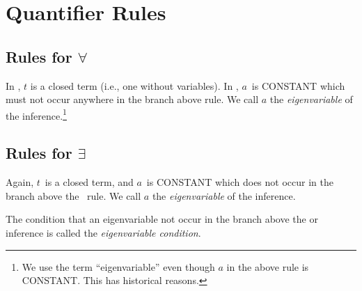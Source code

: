 \documentclass[10pt,a4paper]{article}
\newcommand*{\olup}[1]{\MakeUppercase{#1}}
\theoremstyle{plain}
\theoremstyle{definition}
\theoremstyle{remark}
\newcommand*{\olfileid}[3]{}
\newcommand*{\olsection}[1]{\section*{#1}}
\providecommand{\AxiomC}[1]{}
\providecommand{\UnaryInfC}[1]{}
\providecommand{\RightLabel}[1]{}
\providecommand{\DisplayProof}{}
\providecommand{\lforall}{\mathord{\forall}}
\providecommand{\lexists}{\mathord{\exists}}
\providecommand{\sFmla}[2]{#1(#2)}
\providecommand{\True}{\top}
\providecommand{\False}{\bot}
\providecommand{\TRule}[1]{}
\begin{document}



\olfileid{fol}{tab}{qrl}

\olsection{Quantifier Rules}

\subsection{Rules for $\lforall$}

\begin{defish}
\AxiomC{\sFmla{\True}{\lforall[x][A(x)]}}
\RightLabel{\TRule{\True}{\forall}}
\UnaryInfC{\sFmla{\True}{A(t)}}
\DisplayProof
\hfill
\AxiomC{\sFmla{\False}{\lforall[x][A(x)]}}
\RightLabel{\TRule{\False}{\lforall}}
\UnaryInfC{\sFmla{\False}{A(a)}}
\DisplayProof
\end{defish}

In \TRule{\True}{\lforall}, $t$ is a closed term (i.e., one without
variables). In \TRule{\False}{\lforall}, $a$~is \olup{constant} which
must not occur anywhere in the branch above \TRule{\False}{\lforall}
rule. We call $a$ the \emph{eigenvariable} of the
\TRule{\False}{\forall} inference.\footnote{We use the term
``eigenvariable'' even though $a$ in the above rule is \olup{constant}.
This has historical reasons.}

\subsection{Rules for $\lexists$}

\begin{defish}
\AxiomC{\sFmla{\True}{\lexists[x][A(x)]}}
\RightLabel{\TRule{\True}{\lexists}}
\UnaryInfC{\sFmla{\True}{A(a)}}
\DisplayProof
\hfill
\AxiomC{\sFmla{\False}{\lexists[x][A(x)]}}
\RightLabel{\TRule{\False}{\lexists}}
\UnaryInfC{\sFmla{\False}{A(t)}}
\DisplayProof
\end{defish}

Again, $t$~is a closed term, and $a$~is \olup{constant} which does not
occur in the branch above the~\TRule{\True}{\lexists} rule. We call
$a$ the \emph{eigenvariable} of the \TRule{\True}{\lexists} inference.

The condition that an eigenvariable not occur in the branch above the
\TRule{\False}{\lforall} or \TRule{\True}{\lexists} inference is
called the \emph{eigenvariable condition}.
\end{document}
